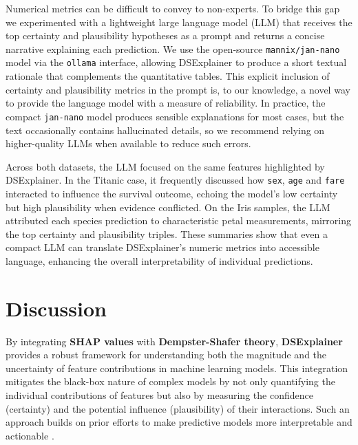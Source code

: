 \documentclass[acmlarge]{acmart}
\begin{document}
Numerical metrics can be difficult to convey to non-experts. To bridge this gap we experimented with a lightweight large language model (LLM) that receives the top certainty and plausibility hypotheses as a prompt and returns a concise narrative explaining each prediction. We use the open-source \texttt{mannix/jan-nano} model via the \texttt{ollama} interface, allowing DSExplainer to produce a short textual rationale that complements the quantitative tables.
This explicit inclusion of certainty and plausibility metrics in the prompt is, to our knowledge, a novel way to provide the language model with a measure of reliability. In practice, the compact \texttt{jan-nano} model produces sensible explanations for most cases, but the text occasionally contains hallucinated details, so we recommend relying on higher-quality LLMs when available to reduce such errors.

Across both datasets, the LLM focused on the same features highlighted by DSExplainer. In the Titanic case, it frequently discussed how \texttt{sex}, \texttt{age} and \texttt{fare} interacted to influence the survival outcome, echoing the model's low certainty but high plausibility when evidence conflicted. On the Iris samples, the LLM attributed each species prediction to characteristic petal measurements, mirroring the top certainty and plausibility triples. These summaries show that even a compact LLM can translate DSExplainer's numeric metrics into accessible language, enhancing the overall interpretability of individual predictions.


\section{Discussion}
\label{sec:discussion}

By integrating \textbf{SHAP values} with \textbf{Dempster-Shafer theory}, \textbf{DSExplainer} provides a robust framework for understanding both the magnitude and the uncertainty of feature contributions in machine learning models. This integration mitigates the black-box nature of complex models by not only quantifying the individual contributions of features but also by measuring the confidence (certainty) and the potential influence (plausibility) of their interactions. Such an approach builds on prior efforts to make predictive models more interpretable and actionable \cite{lundberg2017unified, zhang2021evidential}.
\end{document}
